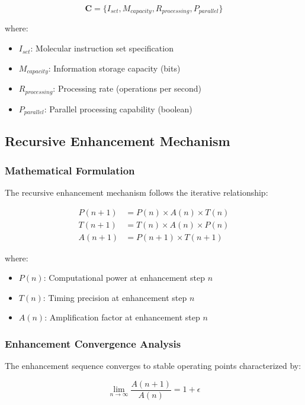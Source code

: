 \begin{equation}
\boldsymbol{C} = \{I_{set}, M_{capacity}, R_{processing}, P_{parallel}\}
\end{equation}

where:
\begin{itemize}
\item $I_{set}$: Molecular instruction set specification
\item $M_{capacity}$: Information storage capacity (bits)
\item $R_{processing}$: Processing rate (operations per second)
\item $P_{parallel}$: Parallel processing capability (boolean)
\end{itemize}

\subsection{Recursive Enhancement Mechanism}

\subsubsection{Mathematical Formulation}

The recursive enhancement mechanism follows the iterative relationship:

\begin{align}
P(n+1) &= P(n) \times A(n) \times T(n) \\
T(n+1) &= T(n) \times A(n) \times P(n) \\
A(n+1) &= P(n+1) \times T(n+1)
\end{align}

where:
\begin{itemize}
\item $P(n)$: Computational power at enhancement step $n$
\item $T(n)$: Timing precision at enhancement step $n$
\item $A(n)$: Amplification factor at enhancement step $n$
\end{itemize}

\subsubsection{Enhancement Convergence Analysis}

The enhancement sequence converges to stable operating points characterized by:

\begin{equation}
\lim_{n \to \infty} \frac{A(n+1)}{A(n)} = 1 + \epsilon
\end{equation}

